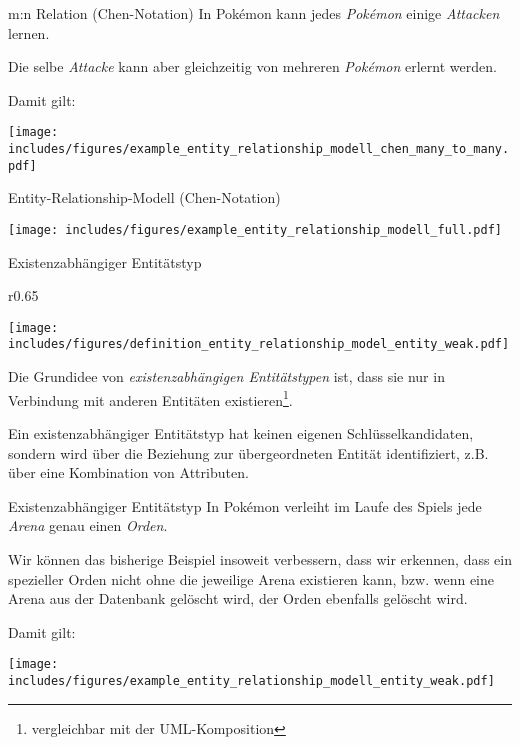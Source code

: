 \begin{example}{m:n Relation (Chen-Notation)}
    In Pokémon kann jedes \emph{Pokémon} einige \emph{Attacken} lernen.

    Die selbe \emph{Attacke} kann aber gleichzeitig von mehreren \emph{Pokémon} erlernt werden.

    Damit gilt:
    \begin{center}
        \texttt{[image: includes/figures/example\_entity\_relationship\_modell\_chen\_many\_to\_many.pdf]}
    \end{center}
\end{example}

\begin{example}{Entity-Relationship-Modell (Chen-Notation)}
    \begin{center}
        \texttt{[image: includes/figures/example\_entity\_relationship\_modell\_full.pdf]}
    \end{center}
\end{example}

\begin{defi}{Existenzabhängiger Entitätstyp}
    \begin{wrapfigure}{r}{0.65\textwidth}
        \begin{center}
            \texttt{[image: includes/figures/definition\_entity\_relationship\_model\_entity\_weak.pdf]}
        \end{center}
    \end{wrapfigure}
    Die Grundidee von \emph{existenzabhängigen Entitätstypen} ist, dass sie nur in Verbindung mit anderen Entitäten existieren\footnote{vergleichbar mit der UML-Komposition}.

    Ein existenzabhängiger Entitätstyp hat keinen eigenen Schlüsselkandidaten, sondern wird über die Beziehung zur übergeordneten Entität identifiziert, z.B. über eine Kombination von Attributen.
\end{defi}

\begin{example}{Existenzabhängiger Entitätstyp}
    In Pokémon verleiht im Laufe des Spiels jede \emph{Arena} genau einen \emph{Orden}.

    Wir können das bisherige Beispiel insoweit verbessern, dass wir erkennen, dass ein spezieller Orden nicht ohne die jeweilige Arena existieren kann, bzw. wenn eine Arena aus der Datenbank gelöscht wird, der Orden ebenfalls gelöscht wird.

    Damit gilt:
    \begin{center}
        \texttt{[image: includes/figures/example\_entity\_relationship\_modell\_entity\_weak.pdf]}
    \end{center}
\end{example}

